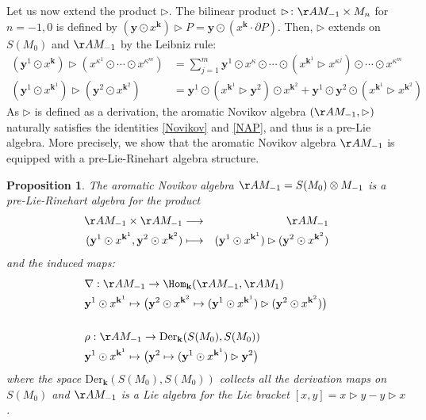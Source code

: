 \documentclass[a4paper,11pt]{article}
\newtheorem{proposition}[theorem]{Proposition}
\newcommand{\pil}{\rightarrow}
\newcommand{\Der}{\text{Der}}
\begin{document}
Let us now extend the product $\rhd$.
The bilinear product $\rhd \colon \AA M_{-1}\times M_n$ for $n=-1,0$ is defined by $(\mathbf y \odot x^{\mathbf k})\rhd P =\mathbf y \odot (x^{\mathbf k}\cdot \partial P)$.
Then, $\rhd$ extends on $S(M_0)$ and $\AA M_{-1}$ by the Leibniz rule:
\begin{align*}
    (\mathbf y^1 \odot x^{\mathbf k})\rhd (x^{\kappa^1}\odot \cdots \odot x^{\kappa^m}) &=
    \sum_{j=1}^m \mathbf y^1\odot x^{\kappa}\odot \cdots \odot (x^{\mathbf k^1} \rhd x^{\kappa^j}) \odot \cdots \odot x^{\kappa^m}\\
    (\mathbf y^1 \odot x^{\mathbf k^1})\rhd (\mathbf y^2 \odot x^{\mathbf k^2}) 
    &= \mathbf y^1\odot (x^{\mathbf k^1} \rhd \mathbf y^2) \odot x^{\mathbf k^2}
    +\mathbf y^1\odot \mathbf y^2 \odot (x^{\mathbf k^1} \rhd x^{\mathbf k^2})
\end{align*}
As $\rhd$ is defined as a derivation, the aromatic Novikov algebra $(\AA M_{-1},\rhd)$ naturally satisfies the identities \eqref{Novikov} and \eqref{NAP}, and thus is a pre-Lie algebra.
More precisely, we show that the aromatic Novikov algebra $\AA M_{-1}$ is equipped with a pre-Lie-Rinehart algebra structure.
\begin{proposition}\label{prelierinehart}
The aromatic Novikov algebra $\AA M_{-1}=S(M_0)\otimes M_{-1}$ is a pre-Lie-Rinehart algebra for the product
\begin{eqnarray*}
\AA M_{-1} \times \AA M_{-1} & \longrightarrow & \AA M_{-1}\\
 (\mathbf y^1 \odot x^{\mathbf k^1}, \mathbf y^2 \odot x^{\mathbf k^2})& \longmapsto  & (\mathbf y^1 \odot x^{\mathbf k^1})\rhd (\mathbf y^2 \odot x^{\mathbf k^2})
\end{eqnarray*}
and the induced maps:
\begin{eqnarray*}
& \nabla:\AA M_{-1} \pil \Hom_{\mathbf k}(\AA M_{-1}, \AA M_{1}) \\
& \mathbf y^1 \odot x^{\mathbf k^1} \mapsto \big(\mathbf y^2 \odot x^{\mathbf k^2} \mapsto (\mathbf y^1 \odot x^{\mathbf k^1}) \rhd( \mathbf y^2 \odot x^{\mathbf k^2}) \big)\\
\\
& \rho:\AA M_{-1} \pil \Der_{\mathbf k}(S(M_0), S(M_0))\\
& \mathbf y^1 \odot x^{\mathbf k^1}\mapsto \big(\mathbf y^2 \mapsto (\mathbf y^1 \odot x^{\mathbf k^1}) \rhd \mathbf y^2\big)
\end{eqnarray*}
where the space $\Der_{\mathbf k}(S(M_0), S(M_0))$ collects all the derivation maps on $S(M_0)$ and $\AA M_{-1}$ is a Lie algebra for the Lie bracket $[x, y]=x\rhd y - y\rhd x$.
\end{proposition}
\end{document}

